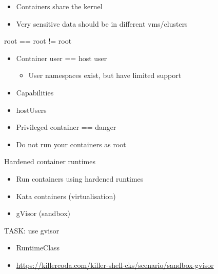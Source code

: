 \documentclass{dcpresentation}
\begin{document}
\begin{frame}
\end{frame}

\begin{frame}
  \begin{itemize}
  \item Containers share the kernel
  \item \alert{Very sensitive data should be in different vms/clusters}
  \end{itemize}
\end{frame}

\begin{frame}{root == root != root}
  \begin{itemize}
  \item Container user == host user
    \begin{itemize}
    \item User namespaces exist, but have limited support
    \end{itemize}
  \item Capabilities
  \item hostUsers
  \item Privileged container == danger
  \item<2> \alert{Do not run your containers as root}
  \end{itemize}
\end{frame}



\begin{frame}{Hardened container runtimes}
  \begin{itemize}
  \item Run containers using hardened runtimes
  \item Kata containers (virtualisation)
  \item gVisor (sandbox)
  \end{itemize}
\end{frame}

\begin{frame}{TASK: use gvisor}
 \begin{itemize}
  \item RuntimeClass
  \item \url{https://killercoda.com/killer-shell-cks/scenario/sandbox-gvisor}
 \end{itemize}
\end{frame}
\end{document}

